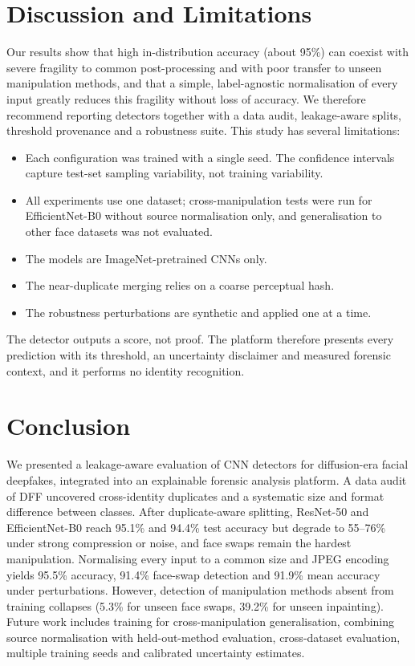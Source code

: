 \documentclass[conference]{IEEEtran}
\begin{document}
\section{Discussion and Limitations}
Our results show that high in-distribution accuracy (about 95\%) can coexist with severe fragility to common post-processing and with poor transfer to unseen manipulation methods, and that a simple, label-agnostic normalisation of every input greatly reduces this fragility without loss of accuracy. We therefore recommend reporting detectors together with a data audit, leakage-aware splits, threshold provenance and a robustness suite. This study has several limitations:
\begin{itemize}
\item Each configuration was trained with a single seed. The confidence intervals capture test-set sampling variability, not training variability.
\item All experiments use one dataset; cross-manipulation tests were run for EfficientNet-B0 without source normalisation only, and generalisation to other face datasets was not evaluated.
\item The models are ImageNet-pretrained CNNs only.
\item The near-duplicate merging relies on a coarse perceptual hash.
\item The robustness perturbations are synthetic and applied one at a time.
\end{itemize}
The detector outputs a score, not proof. The platform therefore presents every prediction with its threshold, an uncertainty disclaimer and measured forensic context, and it performs no identity recognition.

\section{Conclusion}
We presented a leakage-aware evaluation of CNN detectors for diffusion-era facial deepfakes, integrated into an explainable forensic analysis platform. A data audit of DFF uncovered cross-identity duplicates and a systematic size and format difference between classes. After duplicate-aware splitting, ResNet-50 and EfficientNet-B0 reach 95.1\% and 94.4\% test accuracy but degrade to 55--76\% under strong compression or noise, and face swaps remain the hardest manipulation. Normalising every input to a common size and JPEG encoding yields 95.5\% accuracy, 91.4\% face-swap detection and 91.9\% mean accuracy under perturbations. However, detection of manipulation methods absent from training collapses (5.3\% for unseen face swaps, 39.2\% for unseen inpainting). Future work includes training for cross-manipulation generalisation, combining source normalisation with held-out-method evaluation, cross-dataset evaluation, multiple training seeds and calibrated uncertainty estimates.
\end{document}

